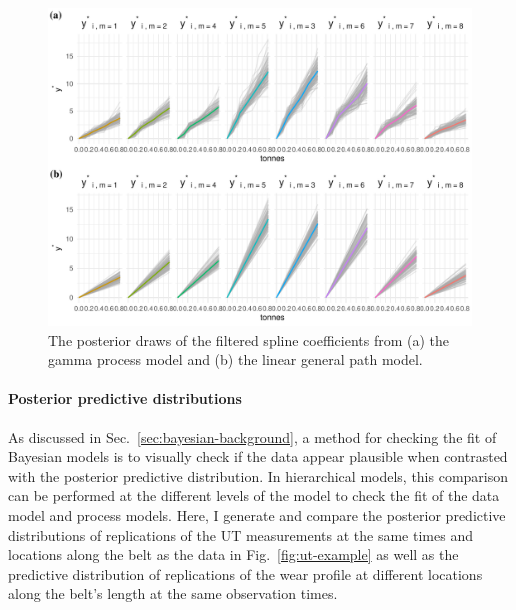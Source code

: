 \begin{figure}
  \centering
  \includegraphics[width=1\textwidth]{figures/ch-6/post_y_belt_wear.pdf}
  \caption{The posterior draws of the filtered spline coefficients from (a) the gamma process model and (b) the linear general path model.}
  \label{fig:y-post-beltwear}
\end{figure}

\paragraph{Posterior predictive distributions}

As discussed in Sec.~\ref{sec:bayesian-background}, a method for checking the fit of Bayesian models is to visually check if the data appear plausible when contrasted with the posterior predictive distribution. In hierarchical models, this comparison can be performed at the different levels of the model to check the fit of the data model and process models. Here, I generate and compare the posterior predictive distributions of replications of the UT measurements at the same times and locations along the belt as the data in Fig.~\ref{fig:ut-example} as well as the predictive distribution of replications of the wear profile at different locations along the belt's length at the same observation times.

